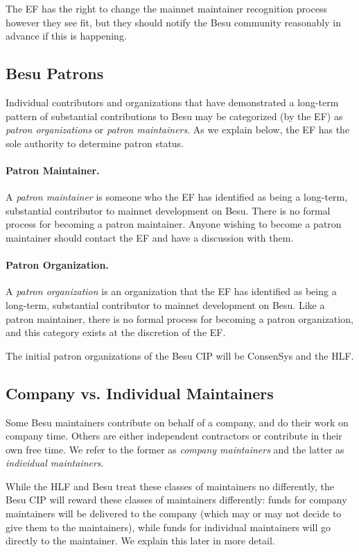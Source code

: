 The EF has the right to change the mainnet maintainer recognition process however they see fit, but they should notify the Besu community reasonably in advance if this is happening.

\subsection{Besu Patrons}
Individual contributors and organizations that have demonstrated a long-term pattern of substantial contributions to Besu may be categorized (by the EF) as \emph{patron organizations} or \emph{patron maintainers}.  As we explain below, the EF has the sole authority to determine patron status.

\paragraph{Patron Maintainer.}  A \emph{patron maintainer} is someone who the EF has identified as being a long-term, substantial contributor to mainnet development on Besu.  There is no formal process for becoming a patron maintainer.  Anyone wishing to become a patron maintainer should contact the EF and have a discussion with them.

\paragraph{Patron Organization.}  A \emph{patron organization} is an organization that the EF has identified as being a long-term, substantial contributor to mainnet development on Besu.  Like a patron maintainer, there is no formal process for becoming a patron organization, and this category exists at the discretion of the EF.

The initial patron organizations of the Besu CIP will be ConsenSys and the HLF.

\subsection{Company vs. Individual Maintainers}
Some Besu maintainers contribute on behalf of a company, and do their work on company time.  Others are either independent contractors or contribute in their own free time.  We refer to the former as \emph{company maintainers} and the latter as \emph{individual maintainers}.

While the HLF and Besu treat these classes of maintainers no differently, the Besu CIP will reward these classes of maintainers differently:  funds for company maintainers will be delivered to the company (which may or may not decide to give them to the maintainers), while funds for individual maintainers will go directly to the maintainer.  We explain this later in more detail.


